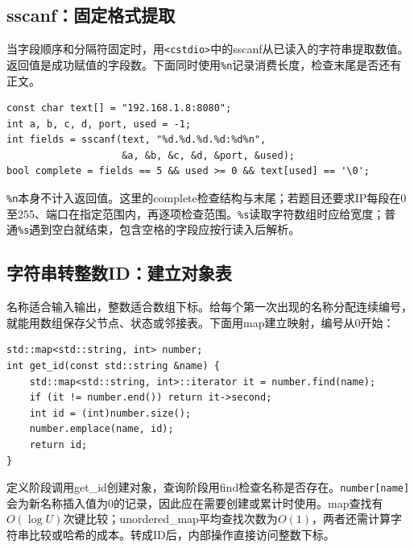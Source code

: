 \documentclass[UTF8,11pt,a4paper,fontset=none]{ctexart}
\begin{document}
\subsection{sscanf：固定格式提取}
当字段顺序和分隔符固定时，用\texttt{<cstdio>}中的sscanf从已读入的字符串提取数值。返回值是成功赋值的字段数。下面同时使用\texttt{\%n}记录消费长度，检查末尾是否还有正文。
\par\noindent\begin{minipage}{\linewidth}
\begin{lstlisting}
const char text[] = "192.168.1.8:8080";
int a, b, c, d, port, used = -1;
int fields = sscanf(text, "%d.%d.%d.%d:%d%n",
                    &a, &b, &c, &d, &port, &used);
bool complete = fields == 5 && used >= 0 && text[used] == '\0';
\end{lstlisting}
\end{minipage}\par
\texttt{\%n}本身不计入返回值。这里的complete检查结构与末尾；若题目还要求IP每段在0至255、端口在指定范围内，再逐项检查范围。\texttt{\%s}读取字符数组时应给宽度；普通\texttt{\%s}遇到空白就结束，包含空格的字段应按行读入后解析。

\subsection{字符串转整数ID：建立对象表}
名称适合输入输出，整数适合数组下标。给每个第一次出现的名称分配连续编号，就能用数组保存父节点、状态或邻接表。下面用map建立映射，编号从0开始：
\par\noindent\begin{minipage}{\linewidth}
\begin{lstlisting}
std::map<std::string, int> number;
int get_id(const std::string &name) {
    std::map<std::string, int>::iterator it = number.find(name);
    if (it != number.end()) return it->second;
    int id = (int)number.size();
    number.emplace(name, id);
    return id;
}
\end{lstlisting}
\end{minipage}\par
定义阶段调用get\_id创建对象，查询阶段用find检查名称是否存在。\texttt{number[name]}会为新名称插入值为0的记录，因此应在需要创建或累计时使用。map查找有$O(\log U)$次键比较；unordered\_map平均查找次数为$O(1)$，两者还需计算字符串比较或哈希的成本。转成ID后，内部操作直接访问整数下标。
\end{document}
